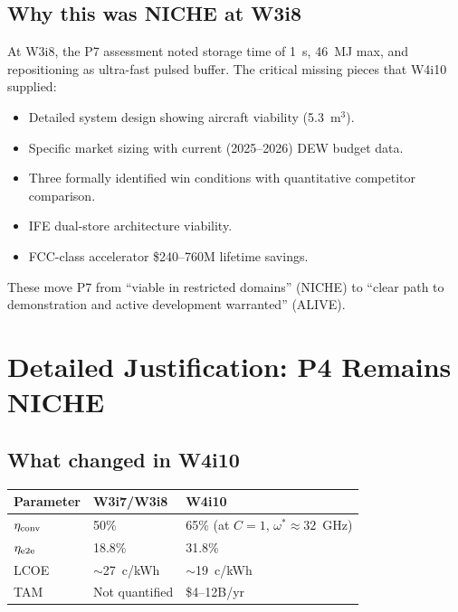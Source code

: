 \documentclass[11pt]{article}
\begin{document}
\subsection{Why this was NICHE at W3i8}

At W3i8, the P7 assessment noted storage time of 1~s, 46~MJ max, and
repositioning as ultra-fast pulsed buffer. The critical missing pieces
that W4i10 supplied:
\begin{itemize}[nosep]
  \item Detailed system design showing aircraft viability (5.3~m$^3$).
  \item Specific market sizing with current (2025--2026) DEW budget data.
  \item Three formally identified win conditions with quantitative
    competitor comparison.
  \item IFE dual-store architecture viability.
  \item FCC-class accelerator \$240--760M lifetime savings.
\end{itemize}

These move P7 from ``viable in restricted domains'' (NICHE) to
``clear path to demonstration and active development warranted'' (ALIVE).

\section{Detailed Justification: P4 Remains NICHE}
\label{sec:P4-niche}

\subsection{What changed in W4i10}

\begin{center}
\begin{tabular}{lll}
\toprule
Parameter & W3i7/W3i8 & W4i10 \\
\midrule
$\eta_{\rm conv}$ & 50\% & 65\% (at $C = 1$, $\omega^* \approx 32$~GHz) \\
$\eta_{\rm e2e}$ & 18.8\% & 31.8\% \\
LCOE & $\sim$27~c/kWh & $\sim$19~c/kWh \\
TAM & Not quantified & \$4--12B/yr \\
\bottomrule
\end{tabular}
\end{center}
\end{document}
